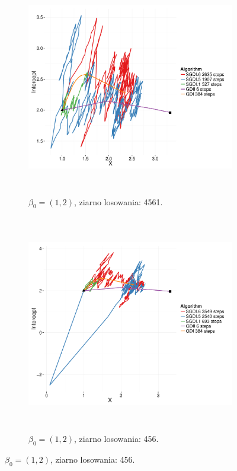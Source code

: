 \begin{figure}[hbt!]
  \begin{center}
   \begin{subfigure}[h!]{0.9\textwidth}
      \includegraphics[width=\textwidth, height=270pt]{Obrazki/sgd_1_2_1.pdf}
      \caption{$\beta_0 = (1,2)$, ziarno losowania: 4561.}
   \end{subfigure}     
   \begin{subfigure}[h!]{0.9\textwidth}
      \includegraphics[width=\textwidth, height=270pt]{Obrazki/sgd_1_2_2.pdf}
      \caption{$\beta_0 = (1,2)$, ziarno losowania: 456.}
   \end{subfigure}  \end{center}

\end{figure}
